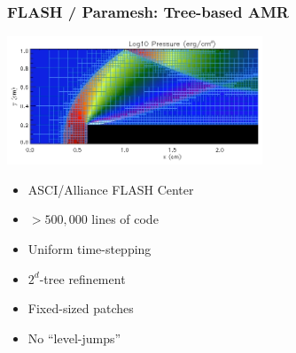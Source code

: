 \begin{frame}[fragile] \frametitle{FLASH / Paramesh: Tree-based AMR}
\centerline{\includegraphics[width=3.0in]{paramesh.png}}
\begin{minipage}{2.3in}
\begin{itemize}
\item ASCI/Alliance FLASH Center
\item $>500,000$ lines of code
\item Uniform time-stepping
\end{itemize}
\end{minipage}
\begin{minipage}{1.8in}
\begin{itemize}
\item $2^d$-tree refinement 
\item Fixed-sized patches
\item No ``level-jumps''
\end{itemize}
\end{minipage}

\end{frame}

% 
